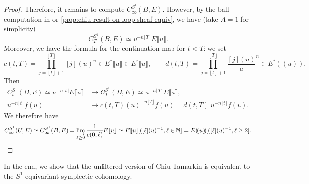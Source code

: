 \documentclass[11pt]{amsart}
\numberwithin{equation}{section}
\theoremstyle{plain}
\theoremstyle{definition}
\theoremstyle{remark}
\newcommand{\bN} { {\mathbb{N}}}
\newcommand{\fpw}[1]{{\llbracket #1\rrbracket}}
\newcommand{\fls}[1]{{(\!(#1 )\!) }}
\def\lf{\left\lfloor}
\def\rf{\right\rfloor}
\begin{document}
\begin{proof}
Therefore, it remains to compute $C^{S^1}_\infty(B,E)$. However, by the ball computation in \cite[Section 3.9]{CyclicZHANG} or \autoref{prop:chiu result on loop sheaf equiv}, we have (take $A=1$ for simplicity)
\[C^{S^1}_T(B,E)\simeq u^{-n\lfloor T \rfloor}E\fpw{u}.\]
Moreover, we have the formula for the continuation map for $t<T$: we set
\[c(t,T)=\prod_{j=\lf t\rf+1}^{\lf T\rf}[j](u)^n\in E^*\fpw{u} \in E^*\fpw{u},\qquad d(t,T)=\prod_{j=\lf t\rf+1}^{\lf T\rf}\frac{[j](u)}{u}^n\in E^*\fls{u}.\]
Then 
\begin{align*}
    C^{S^1}_t(B,E)\simeq u^{-n\lfloor t \rfloor}E\fpw{u} &\to C^{S^1}_T(B,E)\simeq u^{-n\lfloor T \rfloor}E\fpw{u}, \\u^{-n\lfloor t \rfloor}f(u)&\mapsto c(t,T)(u)^{-n\lfloor T \rfloor}f(u)= d(t,T)\; u^{-n\lfloor t \rfloor}f(u).
\end{align*}
We therefore have
\[C^{S^1}_\infty(U,E) \simeq  C^{S^1}_\infty(B,E) =\varinjlim_{\ell\geq 0} \frac{1}{c(0,\ell)} E\fpw{u}  \simeq E\fpw{u}[([\ell](u)^{-1},\ell\in \bN]=E\fls{u}[([\ell](u)^{-1},\ell\geq 2].\qedhere\]
\end{proof}

In the end, we show that the unfiltered version of Chiu-Tamarkin is equivalent to the $S^1$-equivariant symplectic cohomology.
\end{document}
